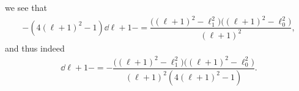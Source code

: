 we see that
\begin{align*}
  -(4(\ell+1)^2-1)\dd{\ell+1}{-} = \dfrac{\bigl((\ell+1)^2-\ell_1^2\bigr)\bigl((\ell+1)^2-\ell_0^2\bigr)}{(\ell+1)^2},
\end{align*}
and thus indeed
\begin{align*}
  \dd{\ell+1}{-} = - \dfrac{\bigl((\ell+1)^2-\ell_1^2\bigr)\bigl((\ell+1)^2-\ell_0^2\bigr)}{(\ell+1)^2(4(\ell+1)^2-1)}.
\end{align*}




